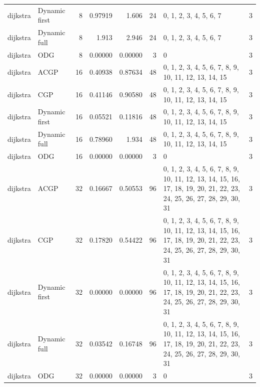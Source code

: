 \documentclass[10pt,a4paper]{article}
\begin{document}
\begin{longtable}{@{}p{23mm}p{29mm}rrrrp{36mm}r@{}}
dijkstra & Dynamic first & 8 & 0.97919 & 1.606 & 24 & 0, 1, 2, 3, 4, 5, 6, 7 & 3 \\
dijkstra & Dynamic full & 8 & 1.913 & 2.946 & 24 & 0, 1, 2, 3, 4, 5, 6, 7 & 3 \\
dijkstra & ODG & 8 & 0.00000 & 0.00000 & 3 & 0 & 3 \\
dijkstra & ACGP & 16 & 0.40938 & 0.87634 & 48 & 0, 1, 2, 3, 4, 5, 6, 7, 8, 9, 10, 11, 12, 13, 14, 15 & 3 \\
dijkstra & CGP & 16 & 0.41146 & 0.90580 & 48 & 0, 1, 2, 3, 4, 5, 6, 7, 8, 9, 10, 11, 12, 13, 14, 15 & 3 \\
dijkstra & Dynamic first & 16 & 0.05521 & 0.11816 & 48 & 0, 1, 2, 3, 4, 5, 6, 7, 8, 9, 10, 11, 12, 13, 14, 15 & 3 \\
dijkstra & Dynamic full & 16 & 0.78960 & 1.934 & 48 & 0, 1, 2, 3, 4, 5, 6, 7, 8, 9, 10, 11, 12, 13, 14, 15 & 3 \\
dijkstra & ODG & 16 & 0.00000 & 0.00000 & 3 & 0 & 3 \\
dijkstra & ACGP & 32 & 0.16667 & 0.50553 & 96 & 0, 1, 2, 3, 4, 5, 6, 7, 8, 9, 10, 11, 12, 13, 14, 15, 16, 17, 18, 19, 20, 21, 22, 23, 24, 25, 26, 27, 28, 29, 30, 31 & 3 \\
dijkstra & CGP & 32 & 0.17820 & 0.54422 & 96 & 0, 1, 2, 3, 4, 5, 6, 7, 8, 9, 10, 11, 12, 13, 14, 15, 16, 17, 18, 19, 20, 21, 22, 23, 24, 25, 26, 27, 28, 29, 30, 31 & 3 \\
dijkstra & Dynamic first & 32 & 0.00000 & 0.00000 & 96 & 0, 1, 2, 3, 4, 5, 6, 7, 8, 9, 10, 11, 12, 13, 14, 15, 16, 17, 18, 19, 20, 21, 22, 23, 24, 25, 26, 27, 28, 29, 30, 31 & 3 \\
dijkstra & Dynamic full & 32 & 0.03542 & 0.16748 & 96 & 0, 1, 2, 3, 4, 5, 6, 7, 8, 9, 10, 11, 12, 13, 14, 15, 16, 17, 18, 19, 20, 21, 22, 23, 24, 25, 26, 27, 28, 29, 30, 31 & 3 \\
dijkstra & ODG & 32 & 0.00000 & 0.00000 & 3 & 0 & 3 \\
\end{longtable}\normalsize\setlength{\tabcolsep}{6pt}
\clearpage
\end{document}
